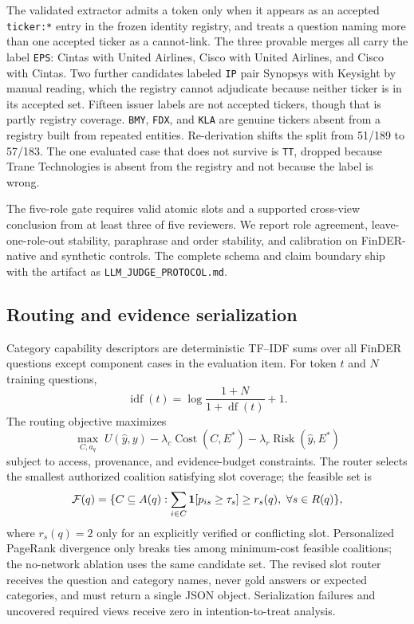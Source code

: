The validated extractor admits a token only when it appears as an accepted \texttt{ticker:*} entry in the frozen identity registry, and treats a question naming more than one accepted ticker as a cannot-link. The three provable merges all carry the label \texttt{EPS}: Cintas with United Airlines, Cisco with United Airlines, and Cisco with Cintas. Two further candidates labeled \texttt{IP} pair Synopsys with Keysight by manual reading, which the registry cannot adjudicate because neither ticker is in its accepted set. Fifteen issuer labels are not accepted tickers, though that is partly registry coverage. \texttt{BMY}, \texttt{FDX}, and \texttt{KLA} are genuine tickers absent from a registry built from repeated entities. Re-derivation shifts the split from 51/189 to 57/183. The one evaluated case that does not survive is \texttt{TT}, dropped because Trane Technologies is absent from the registry and not because the label is wrong.

The five-role gate requires valid atomic slots and a supported cross-view conclusion from at least three of five reviewers. We report role agreement, leave-one-role-out stability, paraphrase and order stability, and calibration on FinDER-native and synthetic controls. The complete schema and claim boundary ship with the artifact as \texttt{LLM\_JUDGE\_PROTOCOL.md}.

\subsection{Routing and evidence serialization}
\label{app:routing}
Category capability descriptors are deterministic TF--IDF sums over all FinDER questions except component cases in the evaluation item. For token $t$ and $N$ training questions,
\[
 \operatorname{idf}(t)=\log\frac{1+N}{1+\operatorname{df}(t)}+1.
\]
The routing objective maximizes
\[
\max_{C,a_q}\; U(\hat y,y)-\lambda_c\operatorname{Cost}(C,E^*)-\lambda_r\operatorname{Risk}(\hat y,E^*)
\]
subject to access, provenance, and evidence-budget constraints. The router selects the smallest authorized coalition satisfying slot coverage; the feasible set is
\[
\mathcal{F}(q)=\{C\subseteq A(q):\sum_{i\in C}{\bf 1}[p_{is}\geq\tau_s]\geq r_s(q),\ \forall s\in R(q)\},
\]
where $r_s(q)=2$ only for an explicitly verified or conflicting slot. Personalized PageRank divergence only breaks ties among minimum-cost feasible coalitions; the no-network ablation uses the same candidate set. The revised slot router receives the question and category names, never gold answers or expected categories, and must return a single JSON object. Serialization failures and uncovered required views receive zero in intention-to-treat analysis.

